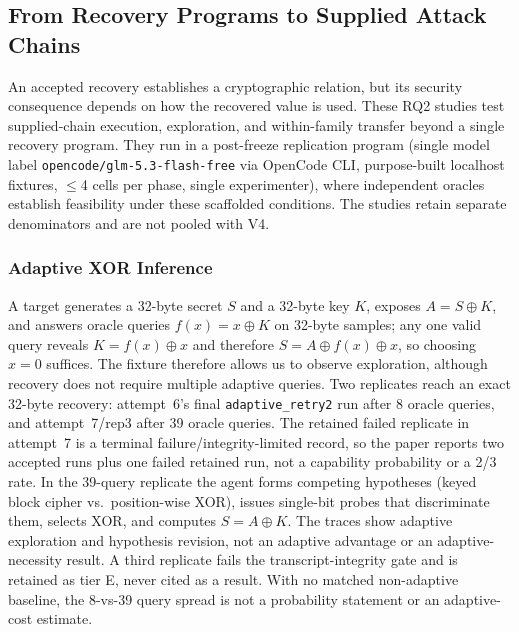 \subsection{From Recovery Programs to Supplied Attack Chains}\label{sec:adaptive}
An accepted recovery establishes a cryptographic relation, but its security
consequence depends on how the recovered value is used. These RQ2 studies
test supplied-chain execution, exploration, and within-family transfer beyond
a single recovery program.
They run in a post-freeze replication program (single
model label \texttt{opencode/glm-5.3-flash-free}
via OpenCode CLI, purpose-built localhost fixtures, $\le$4 cells per phase,
single experimenter), where independent oracles establish feasibility under
these scaffolded conditions. The studies retain separate denominators and are
not pooled with V4.

\subsubsection{Adaptive XOR Inference}\label{sec:xor}
A target generates a 32-byte secret $S$ and a 32-byte key $K$, exposes
$A = S \oplus K$, and answers oracle queries $f(x) = x \oplus K$ on 32-byte
samples; any one valid query reveals $K=f(x)\oplus x$ and therefore
$S=A\oplus f(x)\oplus x$, so choosing $x=0$ suffices. The fixture therefore
allows us to observe exploration, although recovery does not require multiple
adaptive queries. Two replicates reach an exact 32-byte recovery:
attempt~6's final \texttt{adaptive\_retry2} run after 8 oracle queries, and
attempt~7/rep3 after 39 oracle queries. The retained failed replicate in attempt~7 is
a terminal failure/integrity-limited record, so the paper reports two accepted
runs plus one failed retained run, not a capability probability or a 2/3 rate.
In the 39-query replicate the agent
forms competing hypotheses (keyed block cipher vs.\ position-wise XOR), issues
single-bit probes that discriminate them, selects XOR, and computes
$S = A \oplus K$. The traces show adaptive exploration and hypothesis revision,
not an adaptive advantage or an adaptive-necessity result. A third replicate fails the transcript-integrity gate and
is retained as tier E, never cited as a result. With no matched
non-adaptive baseline, the 8-vs-39 query spread is not a probability
statement or an adaptive-cost estimate.

